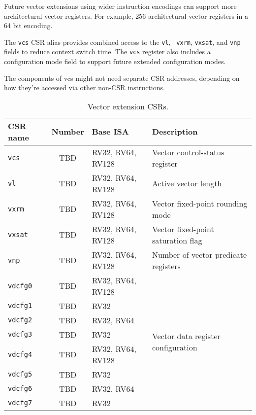 \begin{commentary}
  Future vector extensions using wider instruction encodings can
  support more architectural vector registers. For example, 256
  architectural vector registers in a 64 bit encoding.
\end{commentary}

The {\tt vcs} CSR alias provides combined access to the {\tt vl}, {\tt
  vxrm}, {\tt vxsat}, and {\tt vnp} fields to reduce context switch
time.  The {\tt vcs} register also includes a configuration mode field
to support future extended configuration modes.

\begin{discussion}
The components of vcs might not need separate CSR addresses,
depending on how they're accessed via other non-CSR instructions.
\end{discussion}

\begin{table}
  \centering
  \begin{tabular}{|l|c|l|l|}
    \hline
    CSR name & Number & Base ISA & Description\\
    \hline
    {\tt vcs}  & TBD & RV32, RV64, RV128 & Vector control-status register\\
    {\tt vl}    & TBD & RV32, RV64, RV128 & Active vector length\\
    {\tt vxrm}  & TBD & RV32, RV64, RV128 & Vector fixed-point rounding mode\\
    {\tt vxsat} & TBD & RV32, RV64, RV128 & Vector fixed-point saturation flag \\
    \hline
    {\tt vnp} & TBD & RV32, RV64, RV128 & Number of vector predicate registers\\
    \hline
    {\tt vdcfg0} & TBD & RV32, RV64, RV128 & \multirow{8}{*}{Vector
      data register configuration}\\
    {\tt vdcfg1} & TBD & RV32 &\\
    {\tt vdcfg2} & TBD & RV32, RV64 &\\
    {\tt vdcfg3} & TBD & RV32 &\\
    {\tt vdcfg4}  & TBD & RV32, RV64, RV128 &\\
    {\tt vdcfg5} & TBD & RV32 &\\
    {\tt vdcfg6} & TBD & RV32, RV64 &\\
    {\tt vdcfg7} & TBD & RV32 &\\
    \hline
  \end{tabular}
  \caption{Vector extension CSRs.}
  \label{tab:vcsrs}
\end{table}

